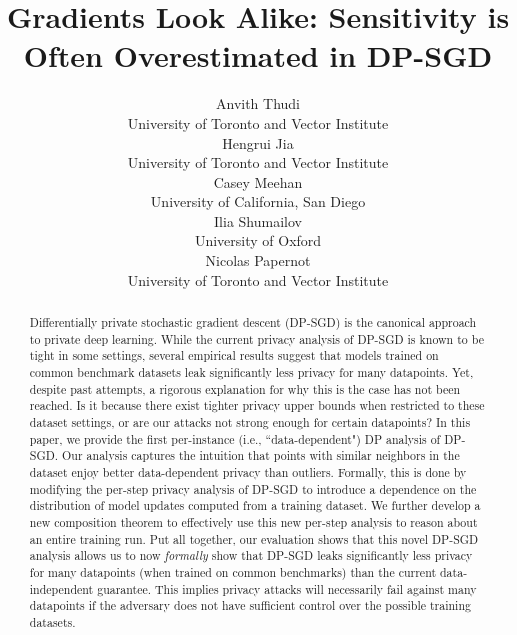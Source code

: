 \documentclass{article}
\theoremstyle{plain}
\theoremstyle{definition}
\theoremstyle{remark}
\begin{document}
\date{}

\title{\Large \bf Gradients Look Alike: Sensitivity is Often Overestimated in DP-SGD}

\author{Anvith Thudi\\
  University of Toronto and Vector Institute\\
  Hengrui Jia \\
  University of Toronto and Vector Institute\\
  Casey Meehan\\
  University of California, San Diego\\
  Ilia Shumailov\\
  University of Oxford\\
  Nicolas Papernot\\
  University of Toronto and Vector Institute\\
}

\maketitle

\begin{abstract}
Differentially private stochastic gradient descent (DP-SGD) is the canonical approach to private deep learning. While the current privacy analysis of DP-SGD is known to be tight in some settings, several empirical results suggest that models trained on common benchmark datasets leak significantly less privacy for many datapoints. Yet, despite past attempts, a rigorous explanation for why this is the case has not been reached. Is it because there exist tighter privacy upper bounds when restricted to these dataset settings, or are our attacks not strong enough for certain datapoints? In this paper, we provide the first per-instance (i.e., ``data-dependent") DP analysis of DP-SGD. Our analysis captures the intuition that points with similar neighbors in the dataset enjoy better data-dependent privacy than outliers. Formally, this is done by modifying the per-step privacy analysis of DP-SGD to introduce a dependence on the distribution of model updates computed from a training dataset. We further develop a new composition theorem to effectively use this new per-step analysis to reason about an entire training run. Put all together, our evaluation shows that this novel DP-SGD analysis allows us to now \emph{formally} show that DP-SGD leaks significantly less privacy for many datapoints (when trained on common benchmarks) than the current data-independent guarantee. This implies privacy attacks will necessarily fail against many datapoints if the adversary does not have sufficient control over the possible training datasets. 
\end{abstract}
\end{document}
